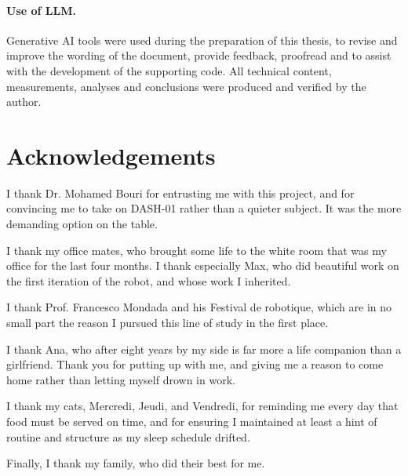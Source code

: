 \documentclass[a4paper, 11 pt]{article}
\begin{document}
{\vspace{1.5em}
\paragraph*{Use of LLM.}
Generative AI tools were used during the preparation of this thesis, to revise and improve the wording of the document, provide feedback, proofread and to assist with the development of the supporting code.
All technical content, measurements, analyses and conclusions were produced and verified by the author.

\newpage
}
{ %

\newpage
\section*{Acknowledgements}

I thank Dr. Mohamed Bouri for entrusting me with this project, and for convincing me to take on DASH-01 rather than a quieter subject. It was the more demanding option on the table.

I thank my office mates, who brought some life to the white room that was my office for the last four months. I thank especially Max, who did beautiful work on the first iteration of the robot, and whose work I inherited.

I thank Prof. Francesco Mondada and his Festival de robotique, which are in no small part the reason I pursued this line of study in the first place.

I thank Ana, who after eight years by my side is far more a life companion than a girlfriend. Thank you for putting up with me, and giving me a reason to come home rather than letting myself drown in work.

I thank my cats, Mercredi, Jeudi, and Vendredi, for reminding me every day that food must be served on time, and for ensuring I maintained at least a hint of routine and structure as my sleep schedule drifted.

Finally, I thank my family, who did their best for me.


\newpage
}
\newpage
\setcounter{tocdepth}{2}
\renewcommand{\contentsname}{Table of Contents}
{
  \hypersetup{linkcolor=black}
  \tableofcontents
}
\newpage











\newpage
{\small


}
\end{document}
